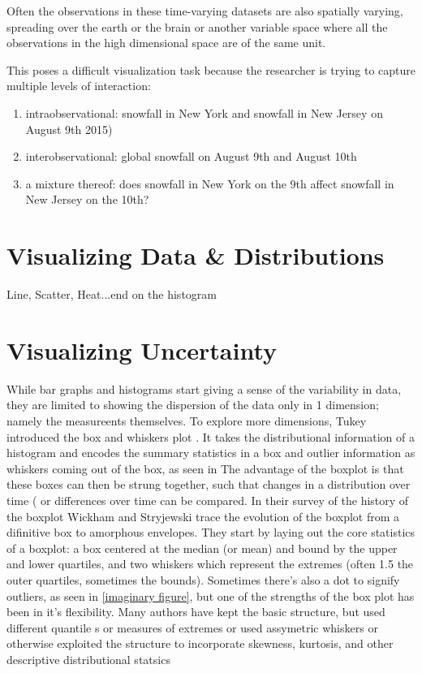 \documentclass[letterpaper,onecolumn,titlepage]{Ythesis}
\begin{document}
Often the observations in these time-varying datasets are also spatially varying, spreading over the earth or the brain or another variable space where all the observations in the high dimensional space are of the same unit. %

This poses a difficult visualization task because the researcher is trying to capture multiple levels of interaction:
\begin{enumerate}
	\item intraobservational: snowfall in New York and snowfall in New Jersey on August 9th 2015)
	\item interobservational: global snowfall on August 9th and August 10th
	\item a mixture thereof: does snowfall in New York on the 9th affect snowfall in New Jersey on the 10th?
\end{enumerate}

\section{Visualizing Data & Distributions}

Line, Scatter, Heat...end on the histogram

\section{Visualizing Uncertainty}

While bar graphs and histograms start giving a sense of the variability in
data, they are limited to showing the dispersion of the data only in 1
dimension; namely the measureents themselves. To explore more dimensions,
Tukey introduced the box and whiskers plot \cite{Tukey1970, Tukey1977}. It
takes the distributional information of a histogram and encodes the summary
statistics in a box and outlier information as whiskers coming out of the box,
as seen in %
The advantage of the boxplot is that these boxes can then be strung together,
such that changes in a distribution over time (%
or differences over time can be compared. In their survey of the history of the
boxplot \cite{Wickham2011} Wickham and Stryjewski trace the evolution of the
boxplot from a difinitive box to amorphous envelopes.  They start by laying out
the core statistics of a boxplot: a box centered at the median (or mean) and
bound by the upper and lower quartiles, and two whiskers which represent the extremes
(often 1.5 the outer quartiles, sometimes the \alpha bounds). Sometimes there's
also a dot to signify outliers, as seen in \ref{imaginary figure}, but one of
the strengths of the box plot has been in it's flexibility. Many authors have
kept the basic structure, but used different quantile \cite{Hyndman}s or
measures of extremes \cite{Frigge, carter} or used assymetric whiskers \cite{Rousseuw}
or otherwise exploited the structure to incorporate skewness, kurtosis, and
other descriptive distributional statsics \cite{ Aslam, choon, Marmelejo}
\end{document}
